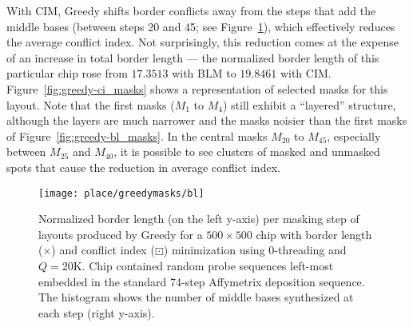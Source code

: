 With CIM, Greedy shifts border conflicts away from the steps that add the
middle bases (between steps 20 and 45; see Figure~\ref{fig:greedy_blm}),
which effectively reduces the average conflict index. Not surprisingly, this
reduction comes at the expense of an increase in total border length --- the
normalized border length of this particular chip rose from $17.3513$ with BLM to
$19.8461$ with CIM. Figure~\ref{fig:greedy-ci_masks} shows a representation of
selected masks for this layout. Note that the first masks ($M_1$ to $M_4$)
still exhibit a ``layered'' structure, although the layers are much narrower
and the masks noisier than the first masks of Figure~\ref{fig:greedy-bl_masks}.
In the central masks $M_{20}$ to $M_{45}$, especially between $M_{25}$ and
$M_{40}$, it is possible to see clusters of masked and unmasked spots that cause
the reduction in average conflict index.

\begin{figure}[t]\centering
\texttt{[image: place/greedymasks/bl]}
\caption{\label{fig:greedy_blm}%
  Normalized border length (on the left y-axis) per masking step
  of layouts produced by Greedy for a $500\times 500$ chip with border length
  ({\tiny $\times$}) and conflict index ({\tiny $\boxdot$}) minimization using
  $0$-threading and $Q=20$K. Chip contained random probe sequences left-most
  embedded in the standard 74-step Affymetrix deposition sequence. The histogram
  shows the number of middle bases synthesized at each step (right y-axis).}
\end{figure}

